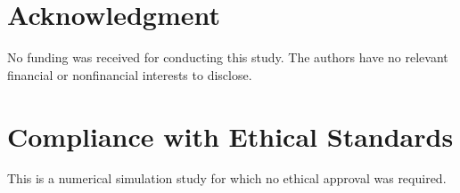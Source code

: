 \documentclass[conference]{IEEEtran}
\begin{document}
\section*{Acknowledgment}
No funding was received for conducting this study. The authors have no relevant financial or nonfinancial interests to disclose.

\section*{Compliance with Ethical Standards}
This is a numerical simulation study for which no ethical approval was required.

\end{document}
